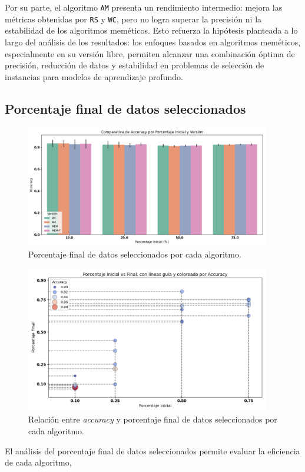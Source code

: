 Por su parte, el algoritmo \texttt{AM} presenta un rendimiento intermedio: mejora las métricas obtenidas por \texttt{RS} y \texttt{WC},
pero no logra superar la precisión ni la estabilidad de los algoritmos meméticos.
Esto refuerza la hipótesis planteada a lo largo del análisis de los resultados: los enfoques basados en algoritmos meméticos,
especialmente en su versión libre, permiten alcanzar una combinación óptima de precisión,
reducción de datos y estabilidad en problemas de selección de instancias para modelos de aprendizaje profundo.

\subsection{Porcentaje final de datos seleccionados}\label{sec:porcentaje-final-datos-seleccionados}
\begin{figure}[htp]
    \centering
    \includegraphics[width=0.95\textwidth]{imagenes/evaluaciones/final/barplot-por-porcentaje}
    \caption{Porcentaje final de datos seleccionados por cada algoritmo.}
    \label{fig:barplot-por-porcentaje}
\end{figure}
\begin{figure}[htp]
    \centering
    \includegraphics[width=0.95\textwidth]{imagenes/evaluaciones/final/scatter}
    \caption{Relación entre \textit{accuracy} y porcentaje final de datos seleccionados por cada algoritmo.}
    \label{fig:scatter-final}
\end{figure}El análisis del porcentaje final de datos seleccionados permite evaluar la eficiencia de cada algoritmo,
